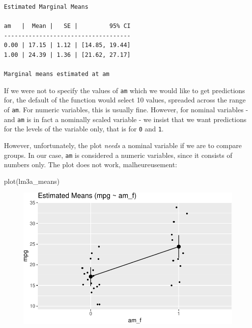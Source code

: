 \documentclass[
  letterpaper,
  DIV=11,
  numbers=noendperiod]{scrreprt}
\newenvironment{Shaded}{\begin{snugshade}}{\end{snugshade}}
\newcommand{\FunctionTok}[1]{\textcolor[rgb]{0.28,0.35,0.67}{#1}}
\newcommand{\NormalTok}[1]{\textcolor[rgb]{0.00,0.23,0.31}{#1}}
\theoremstyle{definition}
\theoremstyle{definition}
\theoremstyle{remark}
\begin{document}
\begin{verbatim}
Estimated Marginal Means

am   |  Mean |   SE |         95% CI
------------------------------------
0.00 | 17.15 | 1.12 | [14.85, 19.44]
1.00 | 24.39 | 1.36 | [21.62, 27.17]

Marginal means estimated at am
\end{verbatim}

If we were not to specify the values of \texttt{am} which we would like
to get predictions for, the default of the function would select 10
values, spreaded across the range of \texttt{am}. For numeric variables,
this is usually fine. However, for nominal variables - and \texttt{am}
is in fact a nominally scaled variable - we insist that we want
predictions for the levels of the variable only, that is for \texttt{0}
and \texttt{1}.

However, unfortunately, the plot \emph{needs} a nominal variable if we
are to compare groups. In our case, \texttt{am} is considered a numeric
variables, since it consists of numbers only. The plot does not work,
malheureusement:

\begin{Shaded}
\begin{Highlighting}[]
\FunctionTok{plot}\NormalTok{(lm3a\_means)}
\end{Highlighting}
\end{Shaded}

\begin{figure}[H]

{\centering \includegraphics{./regression1_files/figure-pdf/unnamed-chunk-12-1.pdf}

}

\end{figure}
\end{document}
